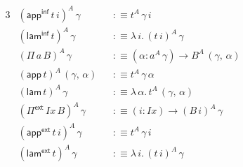 \documentclass[12pt,a4paper,twoside,openany]{book}
\theoremstyle{remark}
\theoremstyle{definition}
\theoremstyle{theorem}
\newcommand{\mi}[1]{\mathit{#1}}
\newcommand{\ms}[1]{\mathsf{#1}}
\newcommand{\Pie}{\Pi^{\mathsf{ext}}}
\newcommand{\appe}{\mathsf{app^{ext}}}
\newcommand{\lame}{\mathsf{lam^{ext}}}
\newcommand{\appinf}{\mathsf{app^{inf}}}
\newcommand{\laminf}{\mathsf{lam^{inf}}}
\newcommand{\app}{\ms{app}}
\newcommand{\lam}{\ms{lam}}
\newcommand{\defn}{:\equiv}
\begin{document}
\begin{alignat*}{3}
  &(\appinf\,t\,i)^A\,\gamma &&\defn t^A\,\gamma\,i\\
  &(\laminf\,t)^A\,\gamma &&\defn \lambda\,i.\,(t\,i)^A\,\gamma\\
  &(\Pi\,a\,B)^A\,\gamma &&\defn (\alpha : a^A\,\gamma) \to B^A\,(\gamma,\,\alpha)\\
  &(\app\,t)^A\,(\gamma,\,\alpha) &&\defn t^A\,\gamma\,\alpha\\
  &(\lam\,t)^A\,\gamma &&\defn \lambda\,\alpha.\,t^A\,(\gamma,\,\alpha)\\
  &(\Pie\,\mi{Ix}\,B)^A\,\gamma &&\defn (i : \mi{Ix}) \to (B\,i)^A\,\gamma\\
  &(\appe\,t\,i)^A\,\gamma &&\defn t^A\,\gamma\,i\\
  &(\lame\,t)^A\,\gamma &&\defn \lambda\,i.\,(t\,i)^A\,\gamma
\end{alignat*}
\end{document}
